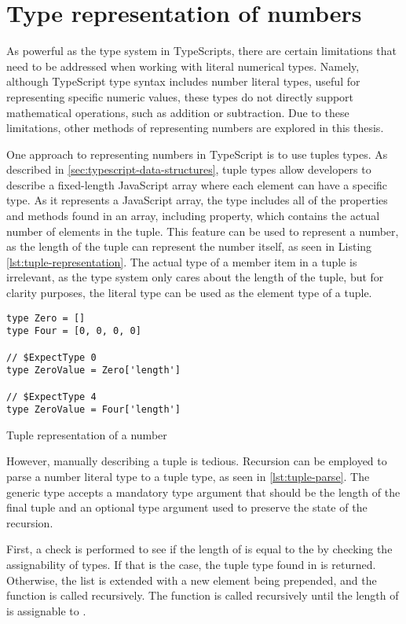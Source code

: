 \section{Type representation of numbers}

As powerful as the type system in TypeScripts, there are certain limitations that need to be addressed when working with literal numerical types. Namely, although TypeScript type syntax includes number literal types, useful for representing specific numeric values, these types do not directly support mathematical operations, such as addition or subtraction. Due to these limitations, other methods of representing numbers are explored in this thesis.

One approach to representing numbers in TypeScript is to use tuples types. As described in \ref{sec:typescript-data-structures}, tuple types allow developers to describe a fixed-length JavaScript array where each element can have a specific type. As it represents a JavaScript array, the type includes all of the properties and methods found in an array, including  property, which contains the actual number of elements in the tuple. This feature can be used to represent a number, as the length of the tuple can represent the number itself, as seen in Listing \ref{lst:tuple-representation}. The actual type of a member item in a tuple is irrelevant, as the type system only cares about the length of the tuple, but for clarity purposes, the literal type  can be used as the element type of a tuple.

\begin{listing}[ht]
  \begin{verbatim}
type Zero = []
type Four = [0, 0, 0, 0] 

// $ExpectType 0
type ZeroValue = Zero['length']

// $ExpectType 4
type ZeroValue = Four['length']
\end{verbatim}
  \caption{Tuple representation of a number}\label{lst:tuple-representation}
\end{listing}

However, manually describing a tuple is tedious. Recursion can be employed to parse a number literal type to a tuple type, as seen in \ref{lst:tuple-parse}. The  generic type accepts a mandatory type argument  that should be the length of the final tuple and an optional type argument  used to preserve the state of the recursion.

First, a check is performed to see if the length of  is equal to the  by checking the assignability of types. If that is the case, the tuple type found in  is returned. Otherwise, the list is extended with a new  element being prepended, and the function is called recursively. The function is called recursively until the length of  is assignable to .

